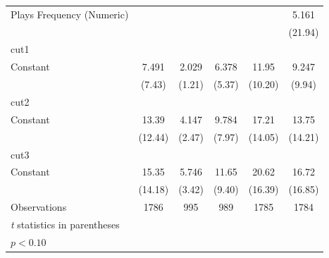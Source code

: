 {\begin{longtable}{l*{5}{c}}
Plays Frequency (Numeric)&                   &                   &                   &                   &       5.161\sym{*}\\
                    &                   &                   &                   &                   &     (21.94)       \\
\midrule
cut1                &                   &                   &                   &                   &                   \\
Constant            &       7.491\sym{*}&       2.029       &       6.378\sym{*}&       11.95\sym{*}&       9.247\sym{*}\\
                    &      (7.43)       &      (1.21)       &      (5.37)       &     (10.20)       &      (9.94)       \\
\midrule
cut2                &                   &                   &                   &                   &                   \\
Constant            &       13.39\sym{*}&       4.147\sym{*}&       9.784\sym{*}&       17.21\sym{*}&       13.75\sym{*}\\
                    &     (12.44)       &      (2.47)       &      (7.97)       &     (14.05)       &     (14.21)       \\
\midrule
cut3                &                   &                   &                   &                   &                   \\
Constant            &       15.35\sym{*}&       5.746\sym{*}&       11.65\sym{*}&       20.62\sym{*}&       16.72\sym{*}\\
                    &     (14.18)       &      (3.42)       &      (9.40)       &     (16.39)       &     (16.85)       \\
\midrule
Observations        &        1786       &         995       &         989       &        1785       &        1784       \\
\bottomrule
\multicolumn{6}{l}{\footnotesize \textit{t} statistics in parentheses}\\
\multicolumn{6}{l}{\footnotesize \sym{*} \(p<0.10\)}\\
\end{longtable}
}

